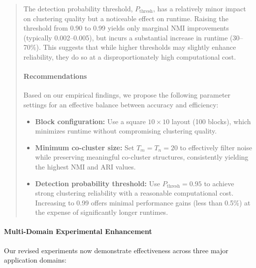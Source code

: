 \documentclass{ar2rc}
\begin{document}
\begin{quote}
  The detection probability threshold, $P_{\text{thresh}}$, has a relatively minor impact on clustering quality but a noticeable effect on runtime. Raising the threshold from 0.90 to 0.99 yields only marginal NMI improvements (typically 0.002--0.005), but incurs a substantial increase in runtime (30--70\%). This suggests that while higher thresholds may slightly enhance reliability, they do so at a disproportionately high computational cost.

  \paragraph{Recommendations}
  Based on our empirical findings, we propose the following parameter settings for an effective balance between accuracy and efficiency:
  \begin{itemize}
    \item \textbf{Block configuration:} Use a square $10 \times 10$ layout (100 blocks), which minimizes runtime without compromising clustering quality.
    \item \textbf{Minimum co-cluster size:} Set $T_m = T_n = 20$ to effectively filter noise while preserving meaningful co-cluster structures, consistently yielding the highest NMI and ARI values.
    \item \textbf{Detection probability threshold:} Use $P_{\text{thresh}} = 0.95$ to achieve strong clustering reliability with a reasonable computational cost. Increasing to 0.99 offers minimal performance gains (less than 0.5\%) at the expense of significantly longer runtimes.
  \end{itemize}
\end{quote}



\paragraph{Multi-Domain Experimental Enhancement}

Our revised experiments now demonstrate effectiveness across three major application domains:
\end{document}
